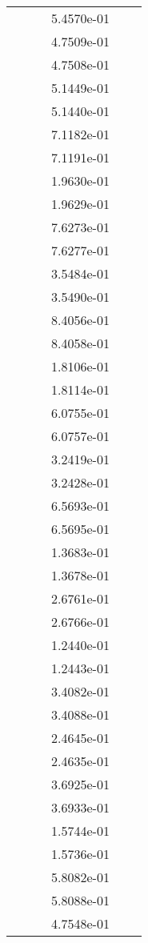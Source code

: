 \begin{xltabular}{\textwidth}{r|rS[table-format=1.3e+2]S[table-format=1.4e+2]S[table-format=1.4e+2]S[table-format=-1.5]}
&  &  & 5.4570e-01 & & \\
&  &  & 4.7509e-01 & & \\
&  &  & 4.7508e-01 & & \\
&  &  & 5.1449e-01 & & \\
&  &  & 5.1440e-01 & & \\
&  &  & 7.1182e-01 & & \\
&  &  & 7.1191e-01 & & \\
&  &  & 1.9630e-01 & & \\
&  &  & 1.9629e-01 & & \\
&  &  & 7.6273e-01 & & \\
&  &  & 7.6277e-01 & & \\
&  &  & 3.5484e-01 & & \\
&  &  & 3.5490e-01 & & \\
&  &  & 8.4056e-01 & & \\
&  &  & 8.4058e-01 & & \\
&  &  & 1.8106e-01 & & \\
&  &  & 1.8114e-01 & & \\
&  &  & 6.0755e-01 & & \\
&  &  & 6.0757e-01 & & \\
&  &  & 3.2419e-01 & & \\
&  &  & 3.2428e-01 & & \\
&  &  & 6.5693e-01 & & \\
&  &  & 6.5695e-01 & & \\
&  &  & 1.3683e-01 & & \\
&  &  & 1.3678e-01 & & \\
&  &  & 2.6761e-01 & & \\
&  &  & 2.6766e-01 & & \\
&  &  & 1.2440e-01 & & \\
&  &  & 1.2443e-01 & & \\
&  &  & 3.4082e-01 & & \\
&  &  & 3.4088e-01 & & \\
&  &  & 2.4645e-01 & & \\
&  &  & 2.4635e-01 & & \\
&  &  & 3.6925e-01 & & \\
&  &  & 3.6933e-01 & & \\
&  &  & 1.5744e-01 & & \\
&  &  & 1.5736e-01 & & \\
&  &  & 5.8082e-01 & & \\
&  &  & 5.8088e-01 & & \\
&  &  & 4.7548e-01 & & \\

\end{xltabular}
